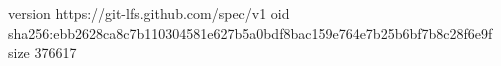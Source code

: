 version https://git-lfs.github.com/spec/v1
oid sha256:ebb2628ca8c7b110304581e627b5a0bdf8bac159e764e7b25b6bf7b8c28f6e9f
size 376617

